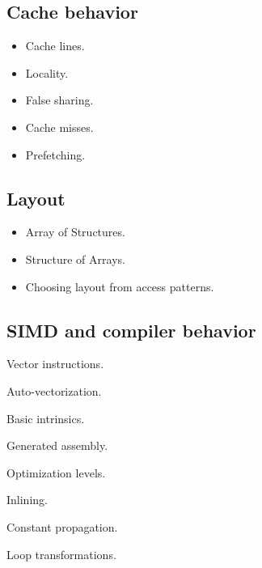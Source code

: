 \documentclass[11pt,letterpaper]{article}
\begin{document}
\subsection*{Cache behavior}

\begin{itemize}

\item Cache lines.

\item Locality.

\item False sharing.

\item Cache misses.

\item Prefetching.

\end{itemize}

\subsection*{Layout}

\begin{itemize}

\item Array of Structures.

\item Structure of Arrays.

\item Choosing layout from access patterns.

\end{itemize}

\subsection*{SIMD and compiler behavior}

\begin{topics}

\item Vector instructions.

\item Auto-vectorization.

\item Basic intrinsics.

\item Generated assembly.

\item Optimization levels.

\item Inlining.

\item Constant propagation.

\item Loop transformations.

\end{topics}
\end{document}
